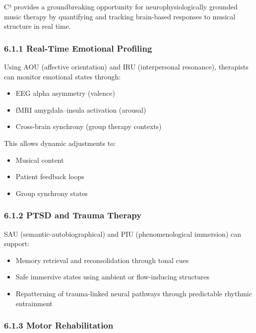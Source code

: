 C³ provides a groundbreaking opportunity for neurophysiologically grounded music therapy by quantifying and tracking brain-based responses to musical structure in real time.

\subsubsection*{6.1.1 Real-Time Emotional Profiling}

Using AOU (affective orientation) and IRU (interpersonal resonance), therapists can monitor emotional states through:

\begin{itemize}
    \item EEG alpha asymmetry (valence)
    \item fMRI amygdala–insula activation (arousal)
    \item Cross-brain synchrony (group therapy contexts)
\end{itemize}

This allows dynamic adjustments to:

\begin{itemize}
    \item Musical content
    \item Patient feedback loops
    \item Group synchrony states
\end{itemize}

\subsubsection*{6.1.2 PTSD and Trauma Therapy}

SAU (semantic-autobiographical) and PIU (phenomenological immersion) can support:

\begin{itemize}
    \item Memory retrieval and reconsolidation through tonal cues
    \item Safe immersive states using ambient or flow-inducing structures
    \item Repatterning of trauma-linked neural pathways through predictable rhythmic entrainment
\end{itemize}

\subsubsection*{6.1.3 Motor Rehabilitation}

